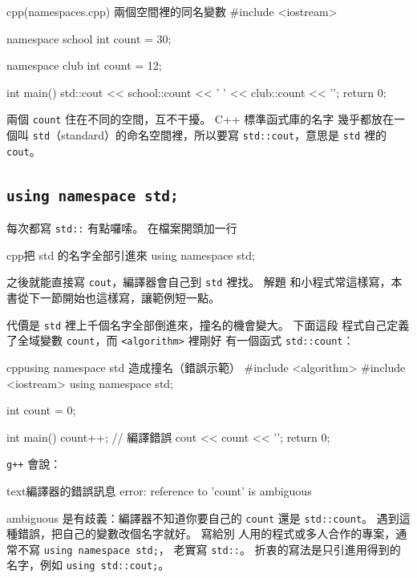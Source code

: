 \begin{example}[label=ex:namespaces]{cpp}{(namespaces.cpp) 兩個空間裡的同名變數}
#include <iostream>

namespace school {
    int count = 30;
}

namespace club {
    int count = 12;
}

int main() {
    std::cout << school::count << ' ' << club::count << '\n';
    return 0;
}
\end{example}


兩個 \texttt{count} 住在不同的空間，互不干擾。 C++ 標準函式庫的名字
幾乎都放在一個叫 \texttt{std}（standard）的命名空間裡，所以要寫
\texttt{std::cout}，意思是 \texttt{std} 裡的 \texttt{cout}。

\subsection{\texttt{using namespace std;}}

每次都寫 \texttt{std::} 有點囉嗦。 在檔案開頭加一行

\begin{code}{cpp}{把 std 的名字全部引進來}
using namespace std;
\end{code}

之後就能直接寫 \texttt{cout}，編譯器會自己到 \texttt{std} 裡找。 解題
和小程式常這樣寫，本書從下一節開始也這樣寫，讓範例短一點。

代價是 \texttt{std} 裡上千個名字全部倒進來，撞名的機會變大。 下面這段
程式自己定義了全域變數 \texttt{count}，而 \texttt{<algorithm>} 裡剛好
有一個函式 \texttt{std::count}：

\begin{code}{cpp}{using namespace std 造成撞名（錯誤示範）}
#include <algorithm>
#include <iostream>
using namespace std;

int count = 0;

int main() {
    count++;               // 編譯錯誤
    cout << count << '\n';
    return 0;
}
\end{code}

\texttt{g++} 會說：

\begin{code}{text}{編譯器的錯誤訊息}
error: reference to 'count' is ambiguous
\end{code}

ambiguous 是有歧義：編譯器不知道你要自己的 \texttt{count} 還是
\texttt{std::count}。 遇到這種錯誤，把自己的變數改個名字就好。 寫給別
人用的程式或多人合作的專案，通常不寫 \texttt{using namespace std;}，
老實寫 \texttt{std::}。 折衷的寫法是只引進用得到的名字，例如
\texttt{using std::cout;}。

